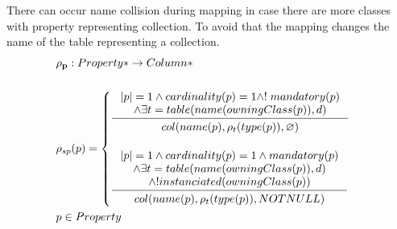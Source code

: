 \documentclass[11pt]{article}
\begin{document}
There can occur name collision during mapping in case there are more classes with property representing collection. To avoid that the mapping changes the name of the table representing a collection.
\begin{align*}
&	\mathbf{\rho_p} : Property* \rightarrow Column* \\ \\
&	\rho_{sp}(p) = \begin{cases}
 		\inference{|p| = 1 \wedge cardinality(p) = 1 \wedge !\;mandatory(p)
 			\\ \wedge \exists t = table(name(owningClass(p)), d) 
		 }{\begin{gathered}
	  		col(name(p), \rho_t(type(p)), \varnothing )
		\end{gathered}} \\ \\
  		\inference{|p| = 1 \wedge cardinality(p) = 1 \wedge mandatory(p)
			 \\ \wedge \exists t = table(name(owningClass(p)), d)
			\\ \wedge ! instanciated(owningClass(p))
		}{\begin{gathered}
 	 		col(name(p), \rho_t(type(p)), NOTNULL ) \\ 
		\end{gathered}}
	\end{cases}\\
&	p \in Property
\end{align*}
\end{document}
